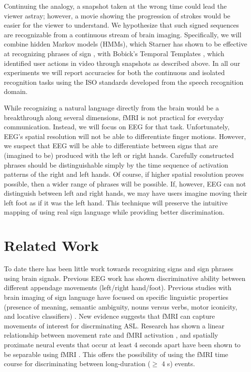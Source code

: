 \documentclass{proposal}
\begin{document}
Continuing the analogy, a snapshot taken at the wrong time could lead the viewer astray; however, a movie showing the progression of strokes would be easier for the viewer to understand.  We hypothesize that such signed sequences are recognizable from a continuous stream of brain imaging.  Specifically, we will combine hidden Markov models (HMMs), which Starner has shown to be effective at recognizing phrases of sign \cite{starner1998rta}, with Bobick's Temporal Templates \cite{bobick2001rhm}, which identified user actions in video through snapshots as described above. In all our experiments we will report accuracies for both the continuous and isolated recognition tasks using the ISO standards developed from the speech recognition domain.

While recognizing a natural language directly from the brain would be a breakthrough along several dimensions, fMRI is not practical for everyday communication.  Instead, we will focus on EEG for that task.  Unfortunately, EEG's spatial resolution will not be able to differentiate finger motions.  However, we suspect that EEG will be able to differentiate between signs that are (imagined to be) produced with the left or right hands.  Carefully constructed phrases should be distinguishable simply by the time sequence of activation patterns of the right and left hands.  Of course, if higher spatial resolution proves possible, then a wider range of phrases will be possible.  If, however, EEG can not distinguish between left and right hands, we may have users imagine moving their left foot as if it was the left hand.  This technique will preserve the intuitive mapping of using real sign language while providing better discrimination.  



\section{Related Work}

To date there has been little work towards recognizing signs and sign phrases using brain signals. Previous EEG work has shown discriminative ability between different appendage movements (left/right hand/foot). Previous studies with brain imaging of sign language have focused on specific linguistic properties (presence of meaning, semantic ambiguity, nouns versus verbs, motor iconicity, and locative classifiers) \cite{supp2005_smr, tranel2005_env, lee2006_mme, dehaene1995_eec, hjorth1975_oie, perrin1988_sss, corina2003_llb, emmorey2004_mis, emmorey_broca_region_2006}. New evidence suggests that fMRI can capture movements of interest for discrminating ASL. Research has shown a linear relationship between movement rate and fMRI activation \cite{rao1996rbf}, and spatially proximate neural events that occur at least 4 seconds apart have been shown to be separable using fMRI \cite{kim1997ltr}. This offers the possibility of using the fMRI time course for discriminating between long-duration ($\geq$ 4 s) events.
\end{document}
